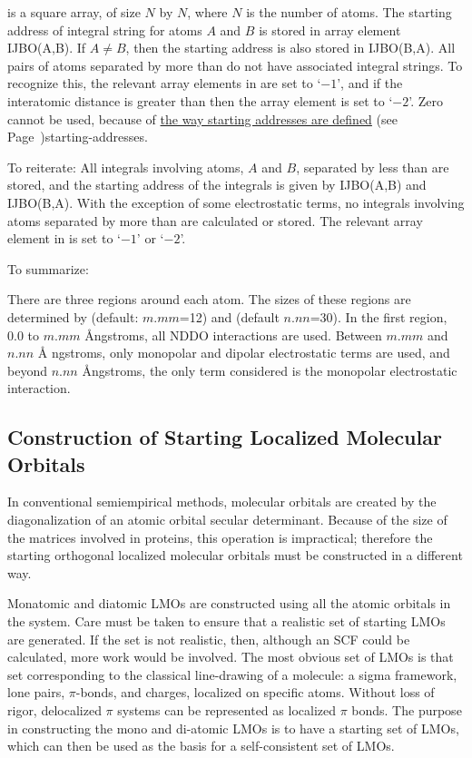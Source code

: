  is a square array, of size $N$ by $N$, where $N$ is the
number of atoms. The starting address of integral string for atoms 
$A$ and $B$ is stored in array element IJBO(A,B).  If $A \ne B$, then the
starting address is also stored in IJBO(B,A).  All pairs of atoms
separated by more than  do not have associated integral
strings.  To recognize this, the relevant array elements in 
are set to `$-1$', and if the interatomic distance is greater than
 then the array element is set to `$-2$'. Zero cannot be
used, because of \hyperref[pageref]{the way starting addresses are
defined}{ (see Page~}{)}{starting-addresses}.

To reiterate: All integrals involving atoms, $A$ and $B$,  separated by  less
than  are stored, and the starting address of the integrals  is
given by IJBO(A,B) and IJBO(B,A).  With the exception of some electrostatic
terms, no integrals involving atoms separated by more than  are
calculated or stored.  The relevant array element in  is set to
`$-1$' or `$-2$'. 


To summarize:

There are three regions around each atom.  The sizes of these regions are
determined by  (default: $m.mm$=12) and
 (default $n.nn$=30). In the first region, 0.0 to $m.mm$
\AA ngstroms, all  NDDO interactions are used.  Between $m.mm$ and $n.nn$ \AA
ngstroms, only monopolar and dipolar electrostatic terms are used, and beyond
$n.nn$ \AA ngstroms, the only term considered is the monopolar electrostatic
interaction.



\subsection{Construction of Starting Localized Molecular Orbitals}
In conventional semiempirical methods, molecular orbitals are created by the
diagonalization of an atomic orbital secular determinant.  Because of the size
of the matrices involved in proteins, this operation is impractical; therefore
the starting orthogonal localized molecular orbitals must be constructed in a
different way.

Monatomic and diatomic LMOs are constructed using all the atomic orbitals in
the system.  Care must be taken to ensure that a realistic set of starting LMOs
are generated.  If the set is not realistic, then, although an SCF could be
calculated, more work would be involved.  The most obvious set of LMOs is that
set corresponding to the classical line-drawing of a molecule: a sigma
framework, lone pairs, $\pi$-bonds, and charges, localized on specific atoms. 
Without loss of rigor, delocalized $\pi$ systems can be represented  as
localized $\pi$ bonds.  The purpose in constructing the mono and di-atomic LMOs
is to have a starting set of LMOs, which can then be used as the basis for a
self-consistent set of LMOs.

